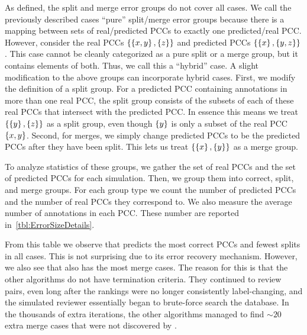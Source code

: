     As defined, the split and merge error groups do not cover all cases.
    We call the previously described cases ``pure'' split/merge error groups because there is a mapping between
      sets of real/predicted PCCs to exactly one predicted/real PCC.
    However, consider the real PCCs $\left\{\left\{x, y\right\}, \left\{z\right\}\right\}$ and predicted PCCs $\left\{\left\{x\right\},
      \left\{y, z\right\}\right\}$.
    This case cannot be cleanly categorized as a pure split or a merge group, but it contains elements of both.
    Thus, we call this a ``hybrid'' case.
    A slight modification to the above groups can incorporate hybrid cases.
    First, we modify the definition of a split group.
    For a predicted PCC containing annotations in more than one real PCC, the split group consists of the subsets
      of each of these real PCCs that intersect with the predicted PCC.
    In essence this means we treat $\left\{\left\{y\right\}, \left\{z\right\}\right\}$ as a split group, even though $\left\{y\right\}$ is
      only a subset of the real PCC $\left\{x, y\right\}$.
    Second, for merges, we simply change predicted PCCs to be the predicted PCCs after they have been split.
    This lets us treat $\left\{\left\{x\right\}, \left\{y\right\}\right\}$ as a merge group.


    To analyze statistics of these groups, we gather the set of real PCCs and the set of predicted PCCs for each
      simulation.
    Then, we group them into correct, split, and merge groups.
    For each group type we count the number of predicted PCCs and the number of real PCCs they correspond to.
    We also measure the average number of annotations in each PCC.
    These number are reported in~\cref{tbl:ErrorSizeDetails}.

    From this table we observe that  predicts the most correct PCCs and fewest splits in all cases.
    This is not surprising due to its error recovery mechanism.
    However, we also see that  also has the most merge cases.
    The reason for this is that the other algorithms do not have termination criteria.
    They continued to review pairs, even long after the rankings were no longer consistently label-changing, and
      the simulated reviewer essentially began to brute-force search the database.
    In the thousands of extra iterations, the other algorithms managed to find ${\sim}20$ extra merge cases that
      were not discovered by .

